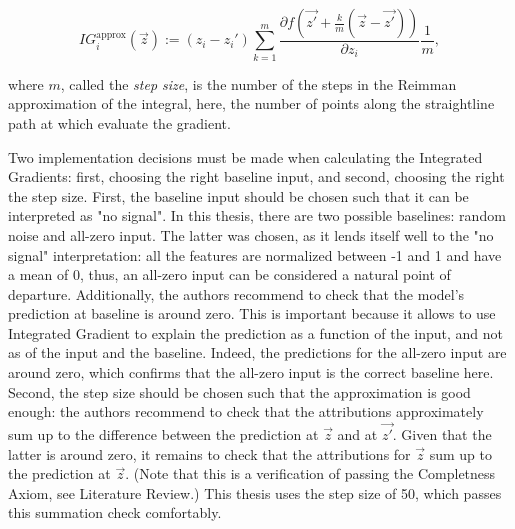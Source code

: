 			\begin{equation*}
				IG_i^{\text{approx}}(\vec{z}) := (z_i - z_i') \sum_{k=1}^{m} \frac{\partial f(\vec{z'} + \frac{k}{m}(\vec{z}-\vec{z'}))}{\partial z_i}\frac{1}{m},
			\end{equation*} 
	
			where $m$, called the \textit{step size}, is the number of the steps in the Reimman approximation of the integral, here, the number of points along the straightline path at which evaluate the gradient. 
			
			Two implementation decisions must be made when calculating the Integrated Gradients: first, choosing the right baseline input, and second, choosing the right the step size. First, the baseline input should be chosen such that it can be interpreted as "no signal". In this thesis, there are two possible baselines: random noise and all-zero input. The latter was chosen, as it lends itself well to the "no signal" interpretation: all the features are normalized between -1 and 1 and have a mean of 0, thus, an all-zero input can be considered a natural point of departure. Additionally, the authors recommend to check that the model's prediction at baseline is around zero. This is important because it allows to use Integrated Gradient to explain the prediction as a function of the input, and not as of the input and the baseline. Indeed, the predictions for the all-zero input are around zero, which confirms that the all-zero input is the correct baseline here. Second, the step size should be chosen such that the approximation is good enough: the authors recommend to check that the attributions approximately sum up to the difference between the prediction at $\vec{z}$ and at $\vec{z'}$. Given that the latter is around zero, it remains to check that the attributions for $\vec{z}$ sum up to the prediction at $\vec{z}$. (Note that this is a verification of passing the Completness Axiom, see Literature Review.) This thesis uses the step size of 50, which passes this summation check comfortably.  
			
			
			
		
	
		  
	
	
	
	
	
	
	
	
	
	
	
	
	
	